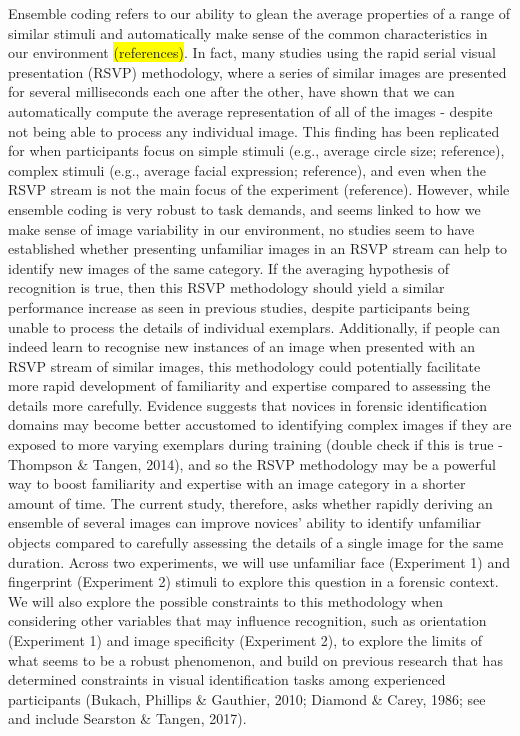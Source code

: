 \documentclass[
  english,
  man]{apa6}
\begin{document}
Ensemble coding refers to our ability to glean the average properties of a range of similar stimuli and automatically make sense of the common characteristics in our environment \colorbox{yellow}{(references)}. In fact, many studies using the rapid serial visual presentation (RSVP) methodology, where a series of similar images are presented for several milliseconds each one after the other, have shown that we can automatically compute the average representation of all of the images - despite not being able to process any individual image. This finding has been replicated for when participants focus on simple stimuli (e.g., average circle size; reference), complex stimuli (e.g., average facial expression; reference), and even when the RSVP stream is not the main focus of the experiment (reference). However, while ensemble coding is very robust to task demands, and seems linked to how we make sense of image variability in our environment, no studies seem to have established whether presenting unfamiliar images in an RSVP stream can help to identify new images of the same category. If the averaging hypothesis of recognition is true, then this RSVP methodology should yield a similar performance increase as seen in previous studies, despite participants being unable to process the details of individual exemplars. Additionally, if people can indeed learn to recognise new instances of an image when presented with an RSVP stream of similar images, this methodology could potentially facilitate more rapid development of familiarity and expertise compared to assessing the details more carefully. Evidence suggests that novices in forensic identification domains may become better accustomed to identifying complex images if they are exposed to more varying exemplars during training (double check if this is true - Thompson \& Tangen, 2014), and so the RSVP methodology may be a powerful way to boost familiarity and expertise with an image category in a shorter amount of time. The current study, therefore, asks whether rapidly deriving an ensemble of several images can improve novices' ability to identify unfamiliar objects compared to carefully assessing the details of a single image for the same duration. Across two experiments, we will use unfamiliar face (Experiment 1) and fingerprint (Experiment 2) stimuli to explore this question in a forensic context. We will also explore the possible constraints to this methodology when considering other variables that may influence recognition, such as orientation (Experiment 1) and image specificity (Experiment 2), to explore the limits of what seems to be a robust phenomenon, and build on previous research that has determined constraints in visual identification tasks among experienced participants (Bukach, Phillips \& Gauthier, 2010; Diamond \& Carey, 1986; see and include Searston \& Tangen, 2017).
\end{document}
